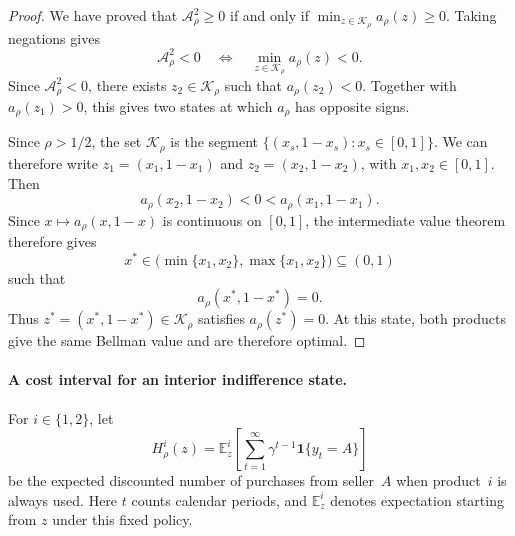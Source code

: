 \documentclass[11pt]{article}
\newcommand{\E}{\mathbb E}
\newcommand{\Ind}[1]{\mathbf 1\{#1\}}
\begin{document}
\begin{proof}
We have proved that $\mathcal A_\rho^2\geq0$ if and only if
$\min_{z\in\mathcal K_\rho}a_\rho(z)\geq0$. Taking negations gives
\begin{equation*}
\mathcal A_\rho^2<0
\quad\Longleftrightarrow\quad
\min_{z\in\mathcal K_\rho}a_\rho(z)<0.
\end{equation*}
Since $\mathcal A_\rho^2<0$, there exists $z_2\in\mathcal K_\rho$
such that $a_\rho(z_2)<0$. Together with $a_\rho(z_1)>0$, this gives
two states at which $a_\rho$ has opposite signs.

Since $\rho>1/2$, the set $\mathcal K_\rho$ is the segment
$\{(x_s,1-x_s):x_s\in[0,1]\}$. We can therefore write
$z_1=(x_1,1-x_1)$ and $z_2=(x_2,1-x_2)$, with $x_1,x_2\in[0,1]$.
Then
\begin{equation*}
a_\rho(x_2,1-x_2)<0<a_\rho(x_1,1-x_1).
\end{equation*}
Since $x\mapsto a_\rho(x,1-x)$ is continuous on $[0,1]$,
the intermediate value theorem therefore gives
\begin{equation*}
x^*\in\bigl(\min\{x_1,x_2\},\max\{x_1,x_2\}\bigr)\subseteq(0,1)
\end{equation*}
such that
\begin{equation*}
a_\rho(x^*,1-x^*)=0.
\end{equation*}
Thus $z^*=(x^*,1-x^*)\in\mathcal K_\rho$ satisfies $a_\rho(z^*)=0$.
At this state, both products give the same Bellman value and are
therefore optimal.
\end{proof}


\paragraph{A cost interval for an interior indifference state.}
For $i\in\{1,2\}$, let
\begin{equation}
H_\rho^i(z)
=\E_z^i\left[\sum_{t=1}^{\infty}\gamma^{t-1}\Ind{y_t=A}\right]
\end{equation}
be the expected discounted number of purchases from seller~$A$ when
product~$i$ is always used. Here $t$ counts calendar periods, and
$\E_z^i$ denotes expectation starting from $z$ under this fixed policy.
\end{document}
